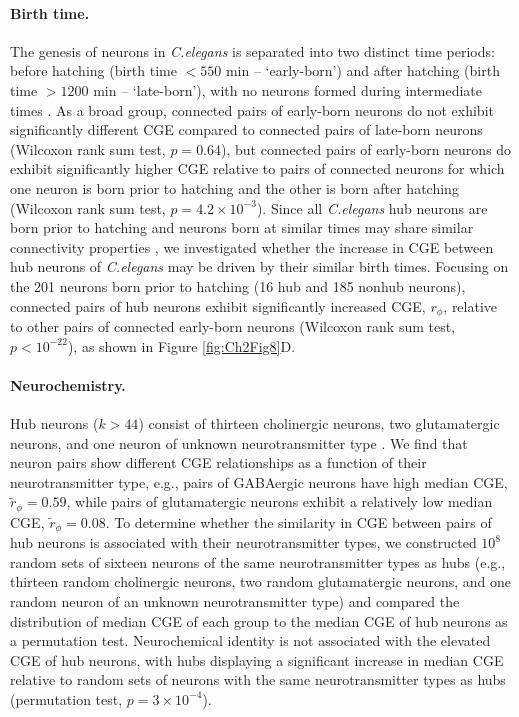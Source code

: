 {\paragraph{Birth time.}
The genesis of neurons in \emph{C.elegans} is separated into two distinct time periods: before hatching (birth time $<550$ min -- `early-born') and after hatching (birth time $>1200$ min -- `late-born'), with no neurons formed during intermediate times \citep{Varier2011}.
As a broad group, connected pairs of early-born neurons do not exhibit significantly different CGE compared to connected pairs of late-born neurons (Wilcoxon rank sum test, $p = 0.64$), but connected pairs of early-born neurons do exhibit significantly higher CGE relative to pairs of connected neurons for which one neuron is born prior to hatching and the other is born after hatching (Wilcoxon rank sum test, $p = 4.2 \times 10^{-3}$).
Since all \emph{C.elegans} hub neurons are born prior to hatching \citep{Towlson2013} and neurons born at similar times may share similar connectivity properties \citep{Varier2011, Towlson2013}, we investigated whether the increase in CGE between hub neurons of \emph{C.elegans} may be driven by their similar birth times.
Focusing on the 201 neurons born prior to hatching (16 hub and 185 nonhub neurons), connected pairs of hub neurons exhibit significantly increased CGE, $r_\phi$, relative to other pairs of connected early-born neurons (Wilcoxon rank sum test, $p < 10^{-22}$), as shown in Figure \ref{fig:Ch2Fig8}D.

\paragraph{Neurochemistry.}
Hub neurons ($k > 44$) consist of thirteen cholinergic neurons, two glutamatergic neurons, and one neuron of unknown neurotransmitter type \citep{Pereira2015}.
We find that neuron pairs show different CGE relationships as a function of their neurotransmitter type, e.g., pairs of GABAergic neurons have high median CGE, $\tilde{r}_\phi = 0.59$, while pairs of glutamatergic neurons exhibit a relatively low median CGE, $\tilde{r}_\phi = 0.08$.
To determine whether the similarity in CGE between pairs of hub neurons is associated with their neurotransmitter types, we constructed $10^8$ random sets of sixteen neurons of the same neurotransmitter types as hubs (e.g., thirteen random cholinergic neurons, two random glutamatergic neurons, and one random neuron of an unknown neurotransmitter type) and compared the distribution of median CGE of each group to the median CGE of hub neurons as a permutation test.
Neurochemical identity is not associated with the elevated CGE of hub neurons, with hubs displaying a significant increase in median CGE relative to random sets of neurons with the same neurotransmitter types as hubs (permutation test, $p = 3\times10^{-4}$).

}
